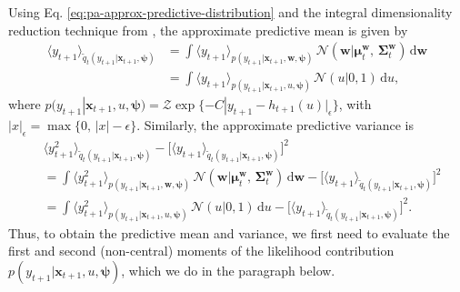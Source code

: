 Using Eq. \eqref{eq:pa-approx-predictive-distribution} and the integral dimensionality reduction technique from \citep{barber-bishop}, the approximate predictive mean is given by
\begin{align}
	\langle y_{t+1} \rangle_{\widetilde{q}_{t}(y_{t+1}|\mathbf{x}_{t+1}, \boldsymbol{\psi})}
	&= \int \langle y_{t+1} \rangle_{p(y_{t+1}|\mathbf{x}_{t+1}, \mathbf{w}, \boldsymbol{\psi})}\,\mathcal{N}(\mathbf{w}|\boldsymbol{\mu}_t^\mathbf{w},\, \boldsymbol{\Sigma}_t^\mathbf{w})\,\mathrm{d}\mathbf{w}
	\nonumber \\
	&= \int \langle y_{t+1} \rangle_{p(y_{t+1}|\mathbf{x}_{t+1}, u, \boldsymbol{\psi})}\,\mathcal{N}(u|0, 1)\,\mathrm{d}u,
	\label{eq:predictive-mean}
\end{align}
where $p(y_{t+1}|\mathbf{x}_{t+1}, u, \boldsymbol{\psi}) = \mathcal{Z}\exp\{-C|y_{t+1} - h_{t+1}(u)|_{\epsilon}\}$, with $|x|_\epsilon = \max\{0,\, |x| - \epsilon\}$. Similarly, the approximate predictive variance is
\begin{align}
	& \langle y_{t+1}^2 \rangle_{\widetilde{q}_{t}(y_{t+1}|\mathbf{x}_{t+1}, \boldsymbol{\psi})}
	- \big[\langle y_{t+1} \rangle_{\widetilde{q}_{t}(y_{t+1}|\mathbf{x}_{t+1}, \boldsymbol{\psi})}\big]^2
	\nonumber \\	
	&= \int \langle y_{t+1}^2 \rangle_{p(y_{t+1}|\mathbf{x}_{t+1}, \mathbf{w}, \boldsymbol{\psi})}\,\mathcal{N}(\mathbf{w}|\boldsymbol{\mu}_t^\mathbf{w},\, \boldsymbol{\Sigma}_t^\mathbf{w})\,\mathrm{d}\mathbf{w}
	- \big[\langle y_{t+1} \rangle_{\widetilde{q}_{t}(y_{t+1}|\mathbf{x}_{t+1}, \boldsymbol{\psi})}\big]^2
	\nonumber \\
	&= \int \langle y_{t+1}^2 \rangle_{p(y_{t+1}|\mathbf{x}_{t+1}, u, \boldsymbol{\psi})}\,\mathcal{N}(u|0, 1)\,\mathrm{d}u
	- \big[\langle y_{t+1} \rangle_{\widetilde{q}_{t}(y_{t+1}|\mathbf{x}_{t+1}, \boldsymbol{\psi})}\big]^2.
	\label{eq:predictive-variance}
\end{align}
Thus, to obtain the predictive mean and variance, we first need to evaluate the first and second (non-central) moments of the likelihood contribution $p(y_{t+1}|\mathbf{x}_{t+1}, u, \boldsymbol{\psi})$, which we do in the paragraph below.

